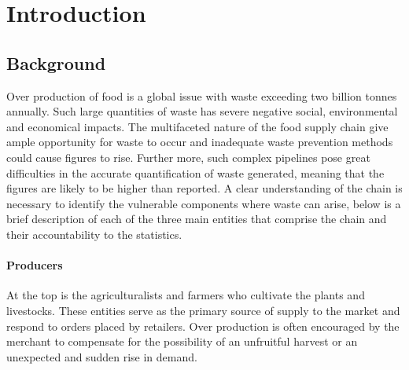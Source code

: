 \documentclass[a4paper, 11pt]{article}
\begin{document}
\clearpage
\thispagestyle{empty}
\newpage

\setcounter{page}{1}
\section{Introduction}

\subsection{Background}
Over production of food is a global issue with waste exceeding two billion tonnes annually\cite{waste}. Such large quantities of waste has severe negative social, environmental and economical impacts. The multifaceted nature of the food supply chain give ample opportunity for waste to occur and inadequate waste prevention methods could cause figures to rise.\cite{FoodWaste} Further more, such complex pipelines pose great difficulties in the accurate quantification of waste generated, meaning that the figures are likely to be higher than reported.\cite{waste} A clear understanding of the chain is necessary to identify the vulnerable components where waste can arise, below is a brief description of each of the three main entities that comprise the chain and their accountability to the statistics.

\paragraph{Producers}At the top is the agriculturalists and farmers who cultivate the plants and livestocks. These entities serve as the primary source of supply to the market and respond to orders placed by retailers. Over production is often encouraged by the merchant to compensate for the possibility of an unfruitful harvest or an unexpected and sudden rise in demand.\cite{waste}
\end{document}
